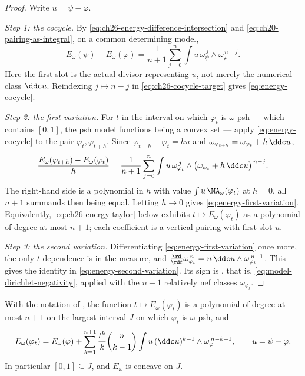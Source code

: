 \begin{proof}
Write \(u=\psi-\varphi\).

\emph{Step 1: the cocycle.}  By
\eqref{eq:ch26-energy-difference-intersection} and
\eqref{eq:ch20-pairing-as-integral}, on a common determining model,
\begin{equation}
\label{eq:ch26-cocycle-target}
 E_\omega(\psi)-E_\omega(\varphi)
 =\frac1{n+1}\sum_{j=0}^n\int u\,
   \omega_\psi^{\,j}\wedge\omega_\varphi^{\,n-j}.
\end{equation}
Here the first slot is the actual divisor representing \(u\), not merely
the numerical class \(\ddc u\).  Reindexing \(j\mapsto n-j\) in
\eqref{eq:ch26-cocycle-target} gives \eqref{eq:energy-cocycle}.

\emph{Step 2: the first variation.}  For \(t\) in the interval on which
\(\varphi_t\) is \(\omega\)-psh --- which contains \([0,1]\), the psh model
functions being a convex set --- apply \eqref{eq:energy-cocycle} to the pair
\(\varphi_t,\varphi_{t+h}\).  Since
\(\varphi_{t+h}-\varphi_t=hu\) and
\(\omega_{\varphi_{t+h}}=\omega_{\varphi_t}+h\,\ddc u\),
\[
 \frac{E_\omega(\varphi_{t+h})-E_\omega(\varphi_t)}{h}
 =\frac1{n+1}\sum_{j=0}^n\int u\,
   \omega_{\varphi_t}^{\,j}\wedge
   \bigl(\omega_{\varphi_t}+h\,\ddc u\bigr)^{\,n-j}.
\]
The right-hand side is a polynomial in \(h\) with value
\(\int u\,\MA_\omega(\varphi_t)\) at \(h=0\), all \(n+1\) summands then being
equal.  Letting \(h\to0\) gives \eqref{eq:energy-first-variation}.
Equivalently, \eqref{eq:ch26-energy-taylor} below exhibits
\(t\mapsto E_\omega(\varphi_t)\) as a polynomial of degree at most
\(n+1\); each coefficient is a vertical pairing with first slot \(u\).

\emph{Step 3: the second variation.}  Differentiating
\eqref{eq:energy-first-variation} once more, the only \(t\)-dependence is in
the measure, and
\(\frac{\rd}{\rd t}\omega_{\varphi_t}^{\,n}=n\,\ddc u\wedge
\omega_{\varphi_t}^{\,n-1}\).  This gives the identity in
\eqref{eq:energy-second-variation}.  Its sign is
, that is,
\eqref{eq:model-dirichlet-negativity}, applied with the \(n-1\) relatively nef
classes \(\omega_{\varphi_t}\).
\end{proof}

\begin{corollary}
\label{cor:ch26-energy-polynomial}
With the notation of , the function
\(t\mapsto E_\omega(\varphi_t)\) is a polynomial of degree at most \(n+1\) on
the largest interval \(J\) on which \(\varphi_t\) is \(\omega\)-psh, and
\begin{equation}
\label{eq:ch26-energy-taylor}
 E_\omega(\varphi_t)
 =E_\omega(\varphi)
  +\sum_{k=1}^{n+1}\frac{t^{k}}{k}\binom{n}{k-1}
   \int u\,(\ddc u)^{k-1}\wedge\omega_\varphi^{\,n-k+1},
 \qquad u=\psi-\varphi .
\end{equation}
In particular \([0,1]\subseteq J\), and \(E_\omega\) is concave on \(J\).
\end{corollary}

